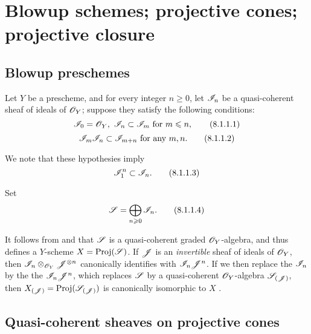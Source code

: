 \section{Blowup schemes; projective cones; projective closure}
\label{section:2.8}

\subsection{Blowup preschemes}
\label{subsection:2.8.1}

\begin{env}[8.1.1]
\label{2.8.1.1}
Let $Y$ be a prescheme, and for every integer $n\geq 0$, let $\mathscr{I}_n$ be a quasi-coherent sheaf of ideals of $\mathscr{O}_Y$; suppose they satisfy the following conditions:
\[
\label{eq:2.8.1.1.1}
  \mathscr{I}_0=\mathscr{O}_Y,\ \mathscr{I}_n\subset\mathscr{I}_m\text{ for }m\leqslant n,
  \tag{8.1.1.1}
\]
\[
\label{eq:2.8.1.1.2}
  \mathscr{I}_m\mathscr{I}_n\subset\mathscr{I}_{m+n}\text{ for any }m,n.
  \tag{8.1.1.2}
\]

We note that these hypothesies imply
\[
\label{eq:2.8.1.1.3}
  \mathscr{I}_1^n\subset\mathscr{I}_n.
  \tag{8.1.1.3}
\]

Set
\[
\label{eq:2.8.1.1.4}
  \mathscr{S}=\bigoplus_{n\geqslant 0}\mathscr{I}_n.
  \tag{8.1.1.4}
\]

It follows from  and  that $\mathscr{S}$ is a quasi-coherent graded $\mathscr{O}_Y$-algebra, and thus defines a $Y$-scheme $X=\operatorname{Proj}(\mathscr{S})$.
If $\mathscr{J}$ is an \emph{invertible} sheaf of ideals of $\mathscr{O}_Y$, then $\mathscr{I}_n\otimes_{\mathscr{O}_Y}\mathscr{J}^{\otimes n}$ canonically identifies with $\mathscr{I}_n\mathscr{J}^n$.
If we then replace the $\mathscr{I}_n$ by the the $\mathscr{I}_n\mathscr{J}^n$, which replaces $\mathscr{S}$ by a quasi-coherent $\mathscr{O}_Y$-algebra $\mathscr{S}_{(\mathscr{J})}$, then $X_{(\mathscr{J})}=\operatorname{Proj}(\mathscr{S}_{(\mathscr{J})})$ is canonically isomorphic to $X$ .
\end{env}

\subsection{Quasi-coherent sheaves on projective cones}
\label{subsection:2.8.12}

